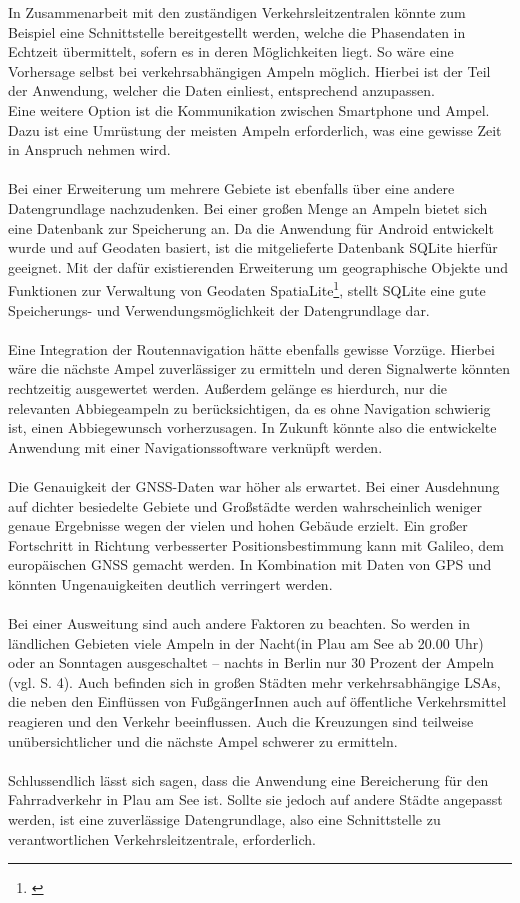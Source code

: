 In Zusammenarbeit mit den zuständigen Verkehrsleitzentralen könnte zum Beispiel eine Schnittstelle bereitgestellt werden, welche die Phasendaten in Echtzeit übermittelt, sofern es in deren Möglichkeiten liegt. So wäre eine Vorhersage selbst bei verkehrsabhängigen Ampeln möglich. Hierbei ist der Teil der Anwendung, welcher die Daten einliest, entsprechend anzupassen.\\
Eine weitere Option ist die Kommunikation zwischen \gls{Smartphone} und Ampel. Dazu ist eine Umrüstung der meisten Ampeln erforderlich, was eine gewisse Zeit in Anspruch nehmen wird. \cite{smart_lsa}\\\\
Bei einer Erweiterung um mehrere Gebiete ist ebenfalls über eine andere Datengrundlage nachzudenken. Bei einer großen Menge an Ampeln bietet sich eine Datenbank zur Speicherung an.
Da die Anwendung für Android entwickelt wurde und auf Geodaten basiert, ist die mitgelieferte Datenbank SQLite hierfür geeignet. Mit der dafür existierenden Erweiterung um geographische Objekte und Funktionen zur Verwaltung von Geodaten SpatiaLite\footnote{\cite{sparta}}, stellt SQLite eine gute Speicherungs- und Verwendungsmöglichkeit der Datengrundlage dar.\\\\
Eine Integration der Routennavigation hätte ebenfalls gewisse Vorzüge. Hierbei wäre die nächste Ampel zuverlässiger zu ermitteln und deren Signalwerte könnten rechtzeitig ausgewertet werden. Außerdem gelänge es hierdurch, nur die relevanten Abbiegeampeln zu berücksichtigen, da es ohne Navigation schwierig ist, einen Abbiegewunsch vorherzusagen. In Zukunft könnte also die entwickelte Anwendung mit einer Navigationssoftware verknüpft werden.\\\\
Die Genauigkeit der \gls{GNSS}-Daten war höher als erwartet. Bei einer Ausdehnung auf dichter besiedelte Gebiete und Großstädte werden wahrscheinlich weniger genaue Ergebnisse wegen der vielen und hohen Gebäude erzielt.
Ein großer Fortschritt in Richtung verbesserter Positionsbestimmung kann mit Galileo, dem europäischen \gls{GNSS} gemacht werden. In Kombination mit Daten von \gls{GPS} und  könnten Ungenauigkeiten deutlich verringert werden. \cite{gnss}\\\\
Bei einer Ausweitung sind auch andere Faktoren zu beachten. So werden in ländlichen Gebieten viele Ampeln in der Nacht(in Plau am See ab 20.00 Uhr) oder an Sonntagen ausgeschaltet -- nachts in Berlin nur 30 Prozent der Ampeln (vgl. \cite{lsa_bln} S. 4). Auch befinden sich in großen Städten mehr verkehrsabhängige \glspl{LSA}, die neben den Einflüssen von FußgängerInnen auch auf öffentliche Verkehrsmittel reagieren und den Verkehr beeinflussen. Auch die Kreuzungen sind teilweise unübersichtlicher und die nächste Ampel schwerer zu ermitteln.\\\\
Schlussendlich lässt sich sagen, dass die Anwendung eine Bereicherung für den Fahrradverkehr in Plau am See ist. Sollte sie jedoch auf andere Städte angepasst werden, ist eine zuverlässige Datengrundlage, also eine Schnittstelle zu verantwortlichen Verkehrsleitzentrale, erforderlich.
